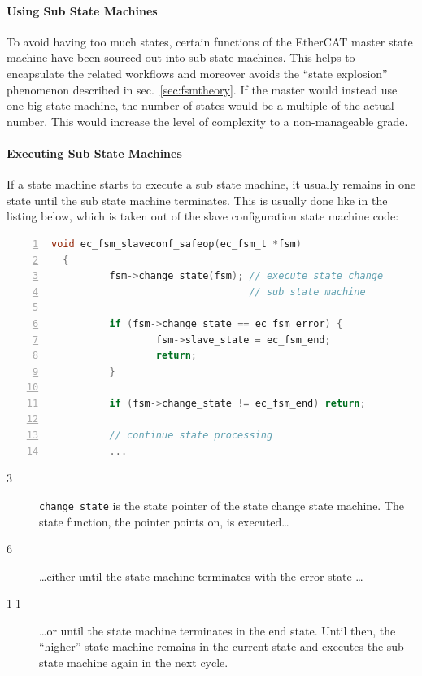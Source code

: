 \documentclass[a4paper,12pt,BCOR6mm,bibtotoc,idxtotoc]{scrbook}
\newcommand{\linenum}[1]{\normalfont\textcircled{\tiny #1}}
\begin{document}
\paragraph{Using Sub State Machines}

To avoid having too much states, certain functions of the EtherCAT master
state machine have been sourced out into sub state machines.  This helps to
encapsulate the related workflows and moreover avoids the ``state explosion''
phenomenon described in sec.~\ref{sec:fsmtheory}. If the master would instead
use one big state machine, the number of states would be a multiple of the
actual number. This would increase the level of complexity to a non-manageable
grade.

\paragraph{Executing Sub State Machines}

If a state machine starts to execute a sub state machine, it usually
remains in one state until the sub state machine terminates. This is
usually done like in the listing below, which is taken out of the
slave configuration state machine code:

\begin{lstlisting}[gobble=2,language=C,numbers=left]
  void ec_fsm_slaveconf_safeop(ec_fsm_t *fsm)
  {
          fsm->change_state(fsm); // execute state change
                                  // sub state machine

          if (fsm->change_state == ec_fsm_error) {
                  fsm->slave_state = ec_fsm_end;
                  return;
          }

          if (fsm->change_state != ec_fsm_end) return;

          // continue state processing
          ...
\end{lstlisting}

\begin{description}

\item[\linenum{3}] \lstinline+change_state+ is the state pointer of the state
change state machine. The state function, the pointer points on, is
executed\ldots

\item[\linenum{6}] \ldots either until the state machine terminates with the
error state \ldots

\item[\linenum{11}] \ldots or until the state machine terminates in the end
state. Until then, the ``higher'' state machine remains in the current state
and executes the sub state machine again in the next cycle.

\end{description}
\end{document}
